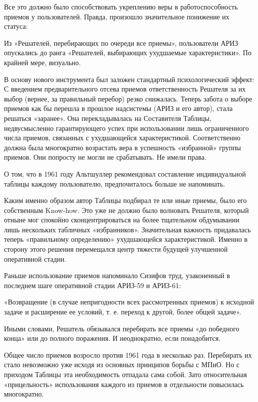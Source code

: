 \documentclass[11pt,a4paper]{article}
\begin{document}
Все это должно было способствовать укреплению веры в работоспособность приемов
у пользователей. Правда, произошло значительное понижение их статуса:

Из «Решателей, перебирающих по очереди все приемы», пользователи АРИЗ
опускались до ранга «Решателей, выбирающих ухудшаемые характеристики». По
крайней мере, визуально.

В основу нового инструмента был заложен стандартный психологический эффект: С
введением предварительного отсева приемов ответственность Решателя за их выбор
(вернее, за правильный перебор) резко снижалась. Теперь забота о выборе
приемов как бы перешла в прошлое надсистемы (АРИЗ и его автор), стала решаться
«заранее». Она перекладывалась на Составителя Таблицы, недвусмысленно
гарантирующего успех при использовании лишь ограниченного числа приемов,
связанных с ухудшающейся характеристикой. Соответственно должна была
многократно возрастать вера в успешность «избранной» группы приемов. Они
попросту не могли не срабатывать. Не имели права.

О том, что в 1961 году Альтшуллер рекомендовал составление индивидуальной
таблицы каждому пользователю, предпочиталось больше не напоминать.

Каким именно образом автор Таблицы подбирал те или иные приемы, было его
собственным Know-how. Это уже не должно было волновать Решателя, который
отныне мог спокойно сконцентрироваться на более тщательном обдумывании лишь
нескольких табличных «избранников». Значительная важность придавалась теперь
«правильному определению» ухудшающейся характеристикой. Именно в сторону этого
решения перемещался центр тяжести будущей улучшенной оперативной стадии.

Раньше использование приемов напоминало Сизифов труд, узаконенный в последнем
шаге оперативной стадии АРИЗ-59 и АРИЗ-61:

«Возвращение (в случае непригодности всех рассмотренных приемов) к исходной
задаче и расширение ее условий, т. е. переход к другой, более общей задаче».

Иными словами, Решатель обязывался перебирать все приемы «до победного конца»
или до полного поражения. И неоднократно, если понадобится.

Общее число приемов возросло против 1961 года в несколько раз. Перебирать их
стало невозможно уже исходя из основных принципов борьбы с МПиО. Но с приходом
Таблицы эта необходимость отпадала сама собой. Зато относительная
«прицельность» использования каждого из приемов в отдельности повысилась
многократно.
\end{document}
